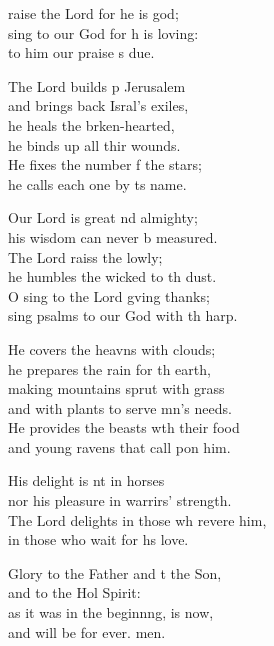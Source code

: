 \settowidth{\versewidth}{The Lord delights in those who revere him, *}
\begin{psalmverse}%
  \begin{patverse}
raise the Lord for he is god;\Flex\\
sing to our God for h is loving:\Med\\
to him our praise \pointup{\i}s due.

The Lord builds p Jerusalem\Med\\
and brings back Isral’s exiles,\\
he heals the brken-hearted,\Med\\
he binds up all thir wounds.\\
He fixes the number f the stars;\Med\\
he calls each one by \pointup{\i}ts name.

Our Lord is great nd almighty;\Med\\
his wisdom can never b measured.\\
The Lord raiss the lowly;\Med\\
he humbles the wicked to th dust.\\
O sing to the Lord g\pointup{\i}ving thanks;\Med\\
sing psalms to our God with th harp.

He covers the heavns with clouds;\Med\\
he prepares the rain for th earth,\\
making mountains sprut with grass\Med\\
and with plants to serve mn’s needs.\\
He provides the beasts w\pointup{\i}th their food\Med\\
and young ravens that call pon him.

His delight is nt in horses\Med\\
nor his pleasure in warrirs’ strength.\\
The Lord delights in those wh revere him,\Med\\
in those who wait for h\pointup{\i}s love.

Glory to the Father and t the Son,\Med\\
and to the Hol Spirit:\\
as it was in the beginn\pointup{\i}ng, is now,\Med\\
and will be for ever. men.
  \end{patverse}
  \end{psalmverse}
